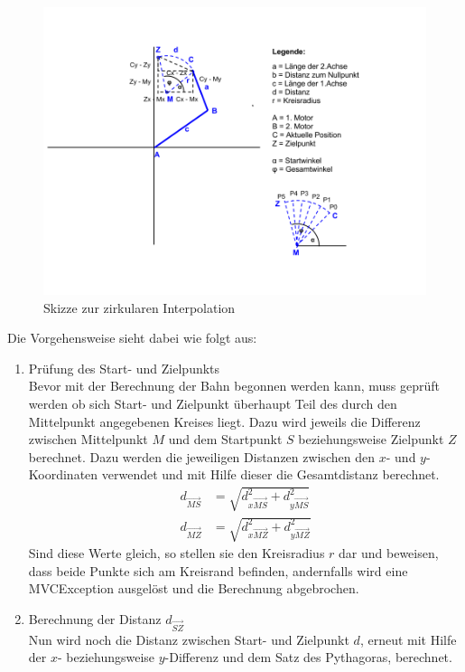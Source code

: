 \begin{itemize}
\begin{figure}[H]
  \centering
  \begin{minipage}[t]{12 cm}
  	\centering
  	\includegraphics[width=12cm]{images/Zirkularinterpolation} 
    \caption{Skizze zur zirkularen Interpolation}
  \end{minipage}
\end{figure}
Die Vorgehensweise sieht dabei wie folgt aus:
\begin{enumerate}
\item Prüfung des Start- und Zielpunkts\\
Bevor mit der Berechnung der Bahn begonnen werden kann, muss geprüft werden ob sich Start- und Zielpunkt überhaupt Teil des durch den Mittelpunkt angegebenen Kreises liegt. Dazu wird jeweils die Differenz zwischen Mittelpunkt $M$ und dem Startpunkt $S$ beziehungsweise Zielpunkt $Z$ berechnet. Dazu werden die jeweiligen Distanzen zwischen den $x$- und $y$-Koordinaten verwendet und mit Hilfe dieser die Gesamtdistanz berechnet.
\begin{align*}
d_{\overrightarrow{MS}} & = \sqrt{d_{x\overrightarrow{MS}}^2 + d_{y\overrightarrow{MS}}^2}\\
d_{\overrightarrow{MZ}} & = \sqrt{d_{x\overrightarrow{MZ}}^2 + d_{y\overrightarrow{MZ}}^2}
\end{align*}
Sind diese Werte gleich, so stellen sie den Kreisradius $r$ dar und beweisen, dass beide Punkte sich am Kreisrand befinden, andernfalls wird eine MVCException ausgelöst und die Berechnung abgebrochen. 
\item Berechnung der Distanz $d_{\overrightarrow{SZ}}$\\
Nun wird noch die Distanz zwischen Start- und Zielpunkt $d$, erneut mit Hilfe der $x$- beziehungsweise $y$-Differenz und dem Satz des Pythagoras, berechnet.

\end{enumerate}
\end{itemize}
